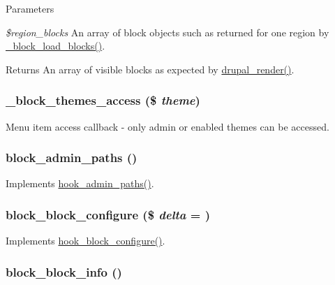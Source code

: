 \begin{DoxyParams}{Parameters}
\item[{\em \$region\_\-blocks}]An array of block objects such as returned for one region by \hyperlink{block_8module_aade0870d32f13ad930bffc6630945029}{\_\-block\_\-load\_\-blocks()}.\end{DoxyParams}
\begin{DoxyReturn}{Returns}
An array of visible blocks as expected by \hyperlink{common_8inc_a05798b44e8d6c496d4bee5cc32fa7851}{drupal\_\-render()}. 
\end{DoxyReturn}
\hypertarget{block_8module_a22dd1b7d12d940c3ffde84a330745658}{
\subsubsection[{\_\-block\_\-themes\_\-access}]{\setlength{\rightskip}{0pt plus 5cm}\_\-block\_\-themes\_\-access (\$ {\em theme})}}
\label{block_8module_a22dd1b7d12d940c3ffde84a330745658}
Menu item access callback -\/ only admin or enabled themes can be accessed. \hypertarget{block_8module_a0fe798e9084f510c0f8712c2a6ecf0ef}{
\subsubsection[{block\_\-admin\_\-paths}]{\setlength{\rightskip}{0pt plus 5cm}block\_\-admin\_\-paths ()}}
\label{block_8module_a0fe798e9084f510c0f8712c2a6ecf0ef}
Implements \hyperlink{group__hooks_ga3fe6d93afc8bb04afbd9e3c326d1bdc1}{hook\_\-admin\_\-paths()}. \hypertarget{block_8module_a35380eeb6fcddcb5959bc2dc1f3d87ea}{
\subsubsection[{block\_\-block\_\-configure}]{\setlength{\rightskip}{0pt plus 5cm}block\_\-block\_\-configure (\$ {\em delta} = {})}}
\label{block_8module_a35380eeb6fcddcb5959bc2dc1f3d87ea}
Implements \hyperlink{group__hooks_gacc86fefd1e0299f387f79a37dd1a48b7}{hook\_\-block\_\-configure()}. \hypertarget{block_8module_a95565cfe7f2b05d193193401ea736a13}{
\subsubsection[{block\_\-block\_\-info}]{\setlength{\rightskip}{0pt plus 5cm}block\_\-block\_\-info ()}}
